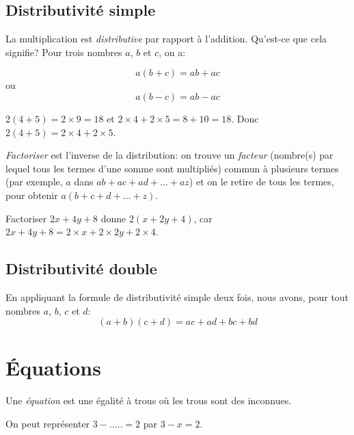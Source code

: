 \subsection{Distributivité simple}

La multiplication est \emph{distributive} par rapport à l'addition. Qu'est-ce que cela signifie? Pour trois nombres $a$, $b$ et $c$, on a:

\begin{equation}
    a(b+c) = ab + ac
\end{equation}
ou
\begin{equation}
    a(b-c) = ab - ac
\end{equation}

\begin{exemple}
    $2(4+5) = 2 \times 9 = 18$ et $2\times 4 + 2\times 5 = 8 + 10 = 18$. Donc $2(4+5) = 2\times 4 + 2\times 5$.
\end{exemple}

\begin{definitionfr}
    \emph{Factoriser} est l'inverse de la distribution: on trouve un \emph{facteur} (nombre(s) par lequel tous les termes d'une somme sont multipliés) commun à plusieurs termes (par exemple, $a$ dans $ab + ac + ad + \dots + az$) et on le retire de tous les termes, pour obtenir $a(b+c+d+\dots+z)$.
\end{definitionfr}

\begin{exemple}
    Factoriser $2x+4y+8$ donne $2(x+2y+4)$, car $2x+4y+8 = 2\times x + 2\times 2y + 2\times 4$.
\end{exemple}

\subsection{Distributivité double}

En appliquant la formule de distributivité simple deux fois, nous avons, pour tout nombres $a$, $b$, $c$ et $d$:
\[
    (a+b)(c+d) = ac + ad + bc + bd
\]

\section{Équations}

\begin{definitionfr}
    Une \emph{équation} est une égalité à trous où les trous sont des inconnues.
\end{definitionfr}
\begin{exemple}
    On peut représenter $3 - ..... = 2$ par $3 - x = 2$.
\end{exemple}

